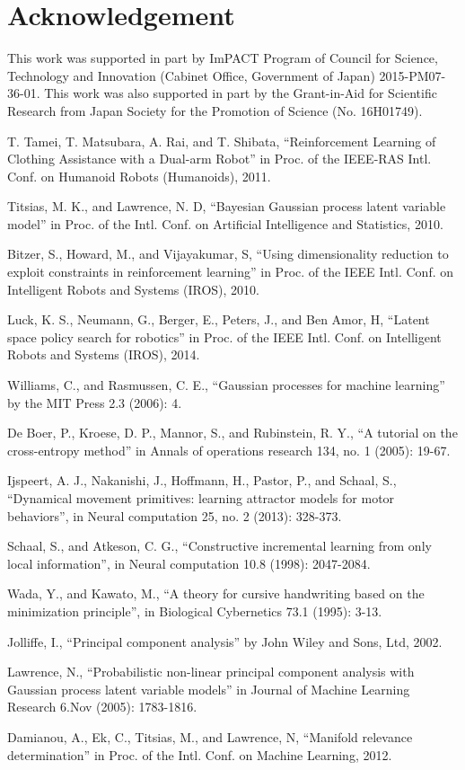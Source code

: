 \documentclass{article}
\begin{document}
\section*{Acknowledgement}
This work was supported in part by ImPACT Program of Council for Science, Technology and Innovation (Cabinet Office, Government of Japan) 2015-PM07-36-01. This work was also supported in part by the Grant-in-Aid for Scientific Research from Japan Society for the Promotion of Science (No. 16H01749).

\small

\begin{thebibliography}{15}
T. Tamei, T. Matsubara, A. Rai, and T. Shibata, ``Reinforcement Learning of Clothing Assistance with a Dual-arm Robot'' in Proc. of the IEEE-RAS Intl. Conf. on Humanoid Robots (Humanoids), 2011.

Titsias, M. K., and Lawrence, N. D, ``Bayesian Gaussian process latent variable model'' in Proc. of the Intl. Conf. on Artificial Intelligence and Statistics, 2010.

Bitzer, S., Howard, M., and Vijayakumar, S, ``Using dimensionality reduction to exploit constraints in reinforcement learning'' in Proc. of the IEEE Intl. Conf. on Intelligent Robots and Systems (IROS), 2010.

Luck, K. S., Neumann, G., Berger, E., Peters, J., and Ben Amor, H, ``Latent space policy search for robotics'' in Proc. of the IEEE Intl. Conf. on Intelligent Robots and Systems (IROS), 2014.

Williams, C., and Rasmussen, C. E., ``Gaussian processes for machine learning'' by the MIT Press 2.3 (2006): 4.

De Boer, P., Kroese, D. P., Mannor, S., and Rubinstein, R. Y., ``A tutorial on the cross-entropy method'' in Annals of operations research 134, no. 1 (2005): 19-67.

Ijspeert, A. J., Nakanishi, J., Hoffmann, H., Pastor, P., and Schaal, S., ``Dynamical movement primitives: learning attractor models for motor behaviors'', in Neural computation 25, no. 2 (2013): 328-373.

Schaal, S., and Atkeson, C. G., ``Constructive incremental learning from only local information'', in Neural computation 10.8 (1998): 2047-2084.

Wada, Y., and Kawato, M., ``A theory for cursive handwriting based on the minimization principle'', in Biological Cybernetics 73.1 (1995): 3-13.

Jolliffe, I., ``Principal component analysis'' by John Wiley and Sons, Ltd, 2002.

Lawrence, N., ``Probabilistic non-linear principal component analysis with Gaussian process latent variable models'' in Journal of Machine Learning Research 6.Nov (2005): 1783-1816.

Damianou, A., Ek, C., Titsias, M., and Lawrence, N, ``Manifold relevance determination'' in Proc. of the Intl. Conf. on Machine Learning, 2012.

\end{thebibliography}
\end{document}
